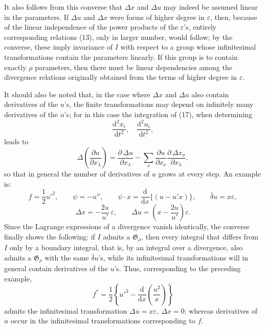 \documentclass[11pt]{article}
\newcommand{\D}{\Delta}
\providecommand{\eps}{\varepsilon}
\providecommand{\dd}{\mathrm d}
\providecommand{\G}{\mathfrak G}
\providecommand{\bd}{\bar{\delta}}
\providecommand{\p}{\partial}
\begin{document}
It also follows from this converse that \(\D x\) and \(\D u\) may indeed be assumed linear in the parameters. If \(\D u\) and \(\D x\) were forms of higher degree in \(\eps\), then, because of the linear independence of the power products of the \(\eps\)'s, entirely corresponding relations (13), only in larger number, would follow; by the converse, these imply invariance of \(I\) with respect to a group whose infinitesimal transformations contain the parameters linearly. If this group is to contain exactly \(\rho\) parameters, then there must be linear dependencies among the divergence relations originally obtained from the terms of higher degree in \(\eps\).

It should also be noted that, in the case where \(\D x\) and \(\D u\) also contain derivatives of the \(u\)'s, the finite transformations may depend on infinitely many derivatives of the \(u\)'s; for in this case the integration of (17), when determining
\[
\frac{\dd^2x_i}{\dd t^2},\quad \frac{\dd^2u_i}{\dd t^2},
\]
leads to
\[
\D\!\left(\frac{\p u}{\p x_\lambda}\right)
=\frac{\p\,\D u}{\p x_\lambda}
-\sum_\nu\frac{\p u}{\p x_\nu}
\frac{\p\,\D x_\nu}{\p x_\lambda},
\]
so that in general the number of derivatives of \(u\) grows at every step. An example is:
\[
f=\frac12 u'^2,\qquad
\psi=-u'',\qquad
\psi\cdot x=\frac{\dd}{\dd x}\{(u-u'x)\},\qquad
\bd u=x\eps,
\]
\[
\D x=-\frac{2u}{u'}\,\eps,\qquad
\D u=\left(x-\frac{2u}{u'}\right)\eps.
\]
Since the Lagrange expressions of a divergence vanish identically, the converse finally shows the following: if \(I\) admits a \(\G_\rho\), then every integral that differs from \(I\) only by a boundary integral, that is, by an integral over a divergence, also admits a \(\G_\rho\) with the same \(\bd u\)'s, while its infinitesimal transformations will in general contain derivatives of the \(u\)'s. Thus, corresponding to the preceding example,
\[
f^*=\frac12\left\{u'^2-\frac{\dd}{\dd x}\left(\frac{u^2}{x}\right)\right\}
\]
admits the infinitesimal transformation \(\D u=x\eps,\ \D x=0\); whereas derivatives of \(u\) occur in the infinitesimal transformations corresponding to \(f\).
\end{document}
